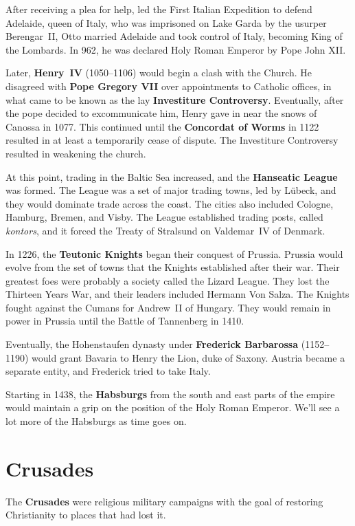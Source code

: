 After receiving a plea for help, led the First Italian Expedition to defend Adelaide, queen of Italy,
who was imprisoned on Lake Garda by the usurper Berengar~II,
Otto married Adelaide and took control of Italy, becoming King of the Lombards.
In 962, he was declared Holy Roman Emperor by Pope John XII\@.

Later, \textbf{Henry~IV} (1050--1106) would begin a clash with the Church.
He disagreed with \textbf{Pope Gregory VII} over appointments to Catholic offices,
in what came to be known as the lay \textbf{Investiture Controversy}.
Eventually, after the pope decided to excommunicate him, Henry gave in near the snows of Canossa in 1077.
This continued until the \textbf{Concordat of Worms} in 1122 resulted in at least a temporarily cease of dispute.
The Investiture Controversy resulted in weakening the church.

At this point, trading in the Baltic Sea increased, and the \textbf{Hanseatic League} was formed.
The League was a set of major trading towns, led by L\"ubeck, and they would dominate trade across the coast.
The cities also included Cologne, Hamburg, Bremen, and Visby.
The League established trading posts, called \textit{kontors},
and it forced the Treaty of Stralsund on Valdemar~IV of Denmark.

In 1226, the \textbf{Teutonic Knights} began their conquest of Prussia.
Prussia would evolve from the set of towns that the Knights established after their war.
Their greatest foes were probably a society called the Lizard League.
They lost the Thirteen Years War, and their leaders included Hermann Von Salza.
The Knights fought against the Cumans for Andrew~II of Hungary.
They would remain in power in Prussia until the Battle of Tannenberg in 1410.

Eventually, the Hohenstaufen dynasty under \textbf{Frederick Barbarossa} (1152--1190)
would grant Bavaria to Henry the Lion, duke of Saxony.
Austria became a separate entity, and Frederick tried to take Italy.

Starting in 1438, the \textbf{Habsburgs} from the south and east parts of the empire
would maintain a grip on the position of the Holy Roman Emperor.
We'll see a lot more of the Habsburgs as time goes on.

\section{Crusades}

The \textbf{Crusades} were religious military campaigns with the goal of restoring Christianity to places that had lost it.


